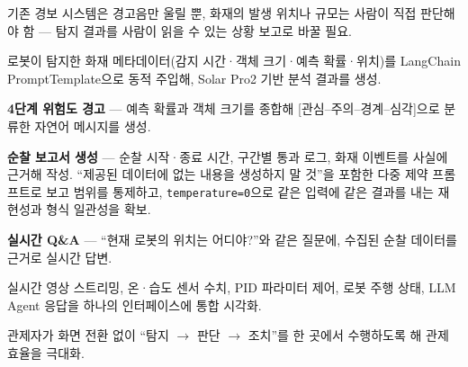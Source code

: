 \begin{substeps}
  \item 기존 경보 시스템은 경고음만 울릴 뿐, 화재의 발생 위치나 규모는 사람이 직접 판단해야 함 --- 탐지 결과를 사람이 읽을 수 있는 상황 보고로 바꿀 필요.
  \item 로봇이 탐지한 화재 메타데이터(감지 시간·객체 크기·예측 확률·위치)를 LangChain PromptTemplate으로 동적 주입해, Solar Pro2 기반 분석 결과를 생성.
  \begin{substeps2}
    \item \textbf{4단계 위험도 경고} --- 예측 확률과 객체 크기를 종합해 [관심--주의--경계--심각]으로 분류한 자연어 메시지를 생성.
    \item \textbf{순찰 보고서 생성} --- 순찰 시작·종료 시간, 구간별 통과 로그, 화재 이벤트를 사실에 근거해 작성. ``제공된 데이터에 없는 내용을 생성하지 말 것''을 포함한 다중 제약 프롬프트로 보고 범위를 통제하고, \texttt{temperature=0}으로 같은 입력에 같은 결과를 내는 재현성과 형식 일관성을 확보.
    \item \textbf{실시간 Q\&A} --- ``현재 로봇의 위치는 어디야?''와 같은 질문에, 수집된 순찰 데이터를 근거로 실시간 답변.
  \end{substeps2}
\end{substeps}

\begin{substeps}
  \item 실시간 영상 스트리밍, 온·습도 센서 수치, PID 파라미터 제어, 로봇 주행 상태, LLM Agent 응답을 하나의 인터페이스에 통합 시각화.
  \item 관제자가 화면 전환 없이 ``탐지 $\to$ 판단 $\to$ 조치''를 한 곳에서 수행하도록 해 관제 효율을 극대화.
\end{substeps}

